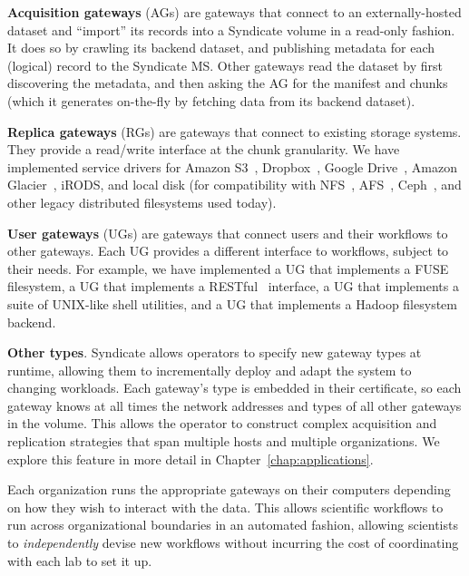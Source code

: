\textbf{Acquisition gateways} (AGs) are gateways that connect to an externally-hosted
dataset and ``import'' its records into a Syndicate volume in a read-only
fashion.  It does so by crawling its backend dataset, and publishing metadata
for each (logical) record to the Syndicate MS.  Other gateways read the dataset
by first discovering the metadata, and then asking the AG for the manifest and
chunks (which it generates on-the-fly by fetching data from its backend
dataset).

\textbf{Replica gateways} (RGs) are gateways that connect to existing storage
systems.  They provide a read/write interface at the chunk granularity.  We have
implemented service drivers for Amazon S3~\cite{s3}, Dropbox~\cite{dropbox},
Google Drive~\cite{google-drive}, Amazon Glacier~\cite{amazon-glacier}, iRODS,
and local disk (for compatibility with NFS~\cite{nfs}, AFS~\cite{afs},
Ceph~\cite{ceph}, and other legacy distributed filesystems used today).

\textbf{User gateways} (UGs) are gateways that connect users and their workflows
to other gateways.  Each UG provides a different interface to workflows, subject
to their needs.  For example, we have implemented a UG that implements a
FUSE~\cite{fuse} filesystem, a UG that implements a RESTful~\cite{rest}
interface, a UG that implements a suite of UNIX-like shell utilities, and a UG
that implements a Hadoop filesystem~\cite{hadoop} backend.

\textbf{Other types}.  Syndicate allows operators to specify new gateway types at runtime, allowing
them to incrementally deploy and adapt the system to changing workloads.  Each
gateway's type is embedded in their certificate, so each gateway knows at all
times the network addresses and types of all other gateways in the volume.
This allows the operator to construct complex acquisition and replication
strategies that span multiple hosts and multiple organizations.
We explore this feature in more detail in Chapter~\ref{chap:applications}.

Each organization runs the appropriate gateways on their computers depending on
how they wish to interact with the data.  This allows scientific workflows to
run across organizational boundaries in an automated fashion, allowing
scientists to \emph{independently} devise new workflows without incurring the
cost of coordinating with each lab to set it up.

